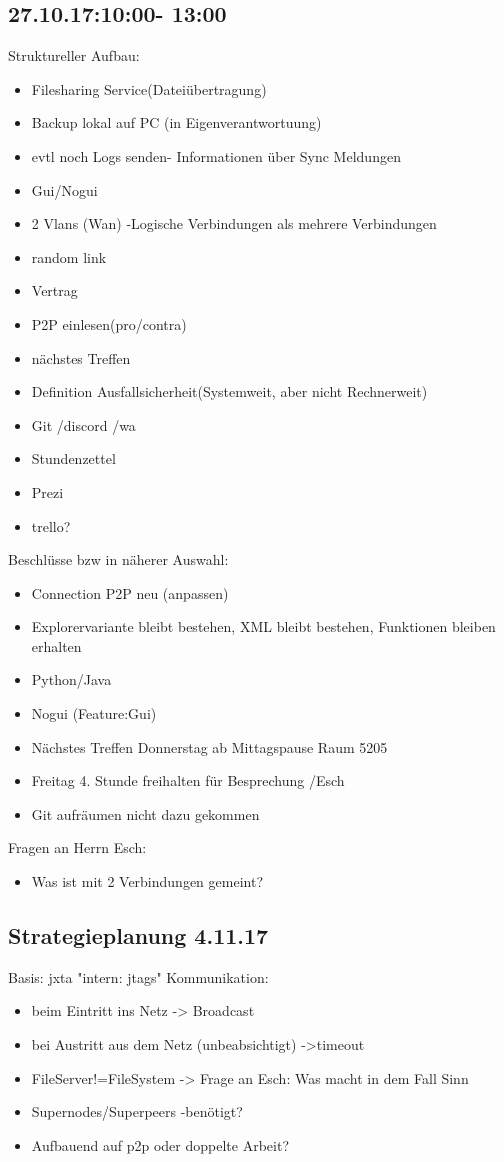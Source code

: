 \documentclass[a4paper,11pt]{article}
\begin{document}
\subsection{27.10.17:10:00- 13:00}
Struktureller Aufbau:
\begin{itemize}
\setlength\itemsep{0.2em}
\item Filesharing Service(Dateiübertragung)
\item Backup lokal auf PC (in Eigenverantwortuung)
\item evtl noch Logs senden-  Informationen über Sync Meldungen
\item Gui/Nogui
\item 2 Vlans (Wan) -Logische Verbindungen als mehrere Verbindungen
\item random link
\item Vertrag
\item P2P einlesen(pro/contra)
\item nächstes Treffen
\item Definition Ausfallsicherheit(Systemweit, aber nicht Rechnerweit)
\item Git /discord /wa
\item Stundenzettel
\item Prezi
\item trello?
\end{itemize}

Beschl\"usse bzw in n\"aherer Auswahl:
\begin{itemize}
\setlength\itemsep{0.2em}
\item Connection P2P neu (anpassen)
\item Explorervariante bleibt bestehen, XML bleibt bestehen, Funktionen bleiben erhalten
\item Python/Java
\item Nogui (Feature:Gui)
\item Nächstes Treffen Donnerstag ab Mittagspause Raum 5205 
\item Freitag 4. Stunde freihalten für Besprechung /Esch
\item Git aufräumen nicht dazu gekommen
\end{itemize}
Fragen an Herrn Esch:
\begin{itemize}
\setlength\itemsep{0.2em}
\item Was ist mit 2 Verbindungen gemeint?
\end{itemize}

\subsection{Strategieplanung 4.11.17}
Basis: jxta "intern: jtags"
Kommunikation:
\begin{itemize}
\setlength\itemsep{0.2em}
\item beim Eintritt ins Netz -> Broadcast
\item bei Austritt aus dem Netz (unbeabsichtigt) ->timeout
\item FileServer!=FileSystem -> Frage an Esch: Was macht in dem Fall Sinn
\item Supernodes/Superpeers -benötigt?
\item Aufbauend auf p2p oder doppelte Arbeit?
\end{itemize}
\end{document}
